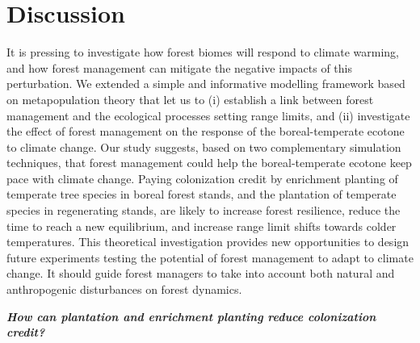 \documentclass[12pt]{article}
\begin{document}
\hypertarget{discussion}{%
\section{Discussion}\label{discussion}}

It is pressing to investigate how forest biomes will respond to climate
warming, and how forest management can mitigate the negative impacts of
this perturbation. We extended a simple and informative modelling
framework based on metapopulation theory that let us to (i) establish a
link between forest management and the ecological processes setting
range limits, and (ii) investigate the effect of forest management on
the response of the boreal-temperate ecotone to climate change. Our
study suggests, based on two complementary simulation techniques, that
forest management could help the boreal-temperate ecotone keep pace with
climate change. Paying colonization credit by enrichment planting of
temperate tree species in boreal forest stands, and the plantation of
temperate species in regenerating stands, are likely to increase forest
resilience, reduce the time to reach a new equilibrium, and increase
range limit shifts towards colder temperatures. This theoretical
investigation provides new opportunities to design future experiments
testing the potential of forest management to adapt to climate change.
It should guide forest managers to take into account both natural and
anthropogenic disturbances on forest dynamics.

\textbf{\emph{How can plantation and enrichment planting reduce
colonization credit?}}
\end{document}
